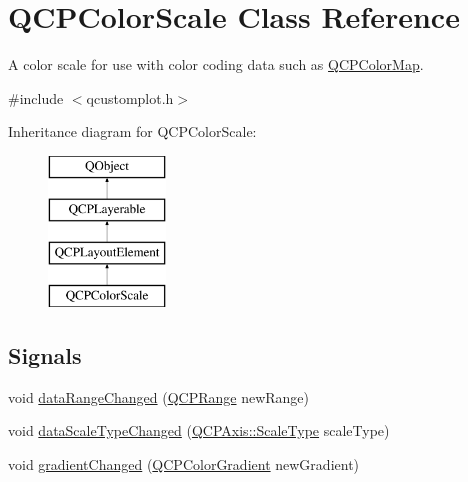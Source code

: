 \hypertarget{class_q_c_p_color_scale}{}\section{Q\+C\+P\+Color\+Scale Class Reference}
\label{class_q_c_p_color_scale}


A color scale for use with color coding data such as \hyperlink{class_q_c_p_color_map}{Q\+C\+P\+Color\+Map}.  




{\ttfamily \#include $<$qcustomplot.\+h$>$}

Inheritance diagram for Q\+C\+P\+Color\+Scale\+:\begin{figure}[H]
\begin{center}
\leavevmode
\includegraphics[height=4.000000cm]{class_q_c_p_color_scale}
\end{center}
\end{figure}
\subsection*{Signals}
\begin{DoxyCompactItemize}
\item 
void \hyperlink{class_q_c_p_color_scale_a293176da9447ec6819be1d901966a257}{data\+Range\+Changed} (\hyperlink{class_q_c_p_range}{Q\+C\+P\+Range} new\+Range)
\item 
void \hyperlink{class_q_c_p_color_scale_a61558b962f7791ff2f15a565dcf60181}{data\+Scale\+Type\+Changed} (\hyperlink{class_q_c_p_axis_a36d8e8658dbaa179bf2aeb973db2d6f0}{Q\+C\+P\+Axis\+::\+Scale\+Type} scale\+Type)
\item 
void \hyperlink{class_q_c_p_color_scale_a67a5eb06cf551d322885e8635a46378c}{gradient\+Changed} (\hyperlink{class_q_c_p_color_gradient}{Q\+C\+P\+Color\+Gradient} new\+Gradient)
\end{DoxyCompactItemize}
